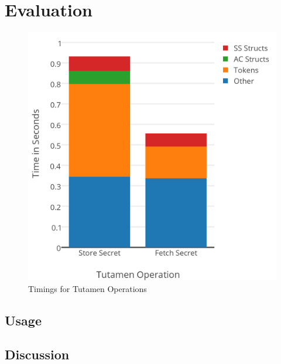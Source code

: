 \section{Evaluation}
\label{sec:eval}

\begin{figure}[th]
  \centering
  \includegraphics[width=\columnwidth]{./figs/png/chart-combined-timings.png}
  \caption{Timings for Tutamen Operations}
  \label{fig:eval:timings}
\end{figure}



\subsection{Usage}

\subsection{Discussion}
